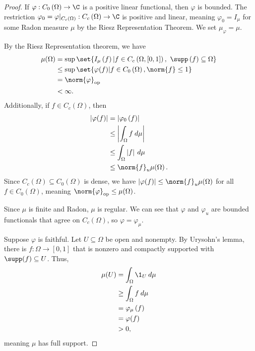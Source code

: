 \documentclass[10pt]{mypackage}
\begin{document}
\begin{proof}
  If $\varphi: C_0\left(\Omega\right)\rightarrow \C$ is a positive linear functional, then $\varphi$ is bounded. The restriction $\varphi_0 = \varphi|_{C_c\left(\Omega\right)}: C_c\left(\Omega\right)\rightarrow \C$ is positive and linear, meaning $\varphi_0 = I_{\mu}$ for some Radon measure $\mu$ by the Riesz Representation Theorem. We set $\mu_{\varphi} = \mu$.\newline

  By the Riesz Representation theorem, we have
  \begin{align*}
    \mu\!\left(\Omega\right) &= \sup\set{I_{\mu}\left(f\right)| f\in C_c\left(\Omega,[0,1]\right),~\supp\left(f\right) \subseteq \Omega}\\
                             &\leq \sup\set{\varphi(f)| f\in C_0\left(\Omega\right),\norm{f}\leq 1}\\
                             &= \norm{\varphi}_{\text{op}}\\
                             &< \infty.
  \end{align*}
  Additionally, if $f\in C_c\left(\Omega\right)$, then
  \begin{align*}
    \left\vert \varphi(f) \right\vert &= \left\vert \varphi_0\left(f\right) \right\vert\\
                                      &\leq \left\vert \int_{\Omega}f\:d\mu \right\vert\\
                                      &\leq \int_{\Omega}\left\vert f \right\vert\:d\mu\\
                                      &\leq \norm{f}_{u}\mu\!\left(\Omega\right).
  \end{align*}
  Since $C_c\left(\Omega\right)\subseteq C_0\left(\Omega\right)$ is dense, we have $\left\vert \varphi(f) \right\vert\leq \norm{f}_u\mu\!\left(\Omega\right)$ for all $f\in C_0\left(\Omega\right)$, meaning $\norm{\varphi}_{\text{op}}\leq \mu\!\left(\Omega\right)$.\newline

  Since $\mu$ is finite and Radon, $\mu$ is regular. We can see that $\varphi$ and $\varphi_u$ are bounded functionals that agree on $C_c\left(\Omega\right)$, so $\varphi = \varphi_{\mu}$.\newline

  Suppose $\varphi$ is faithful. Let $U\subseteq \Omega$ be open and nonempty. By Urysohn's lemma, there is $f: \Omega\rightarrow [0,1]$ that is nonzero and compactly supported with $\supp(f) \subseteq U$. Thus,
  \begin{align*}
    \mu\!\left(U\right) &= \int_{\Omega}\1_{U}\:d\mu\\
                        &\geq \int_{\Omega}f\:d\mu\\
                        &= \varphi_{\mu}\left(f\right)\\
                        &= \varphi(f)\\
                        &> 0,
  \end{align*}
  meaning $\mu$ has full support.
\end{proof}
\end{document}
